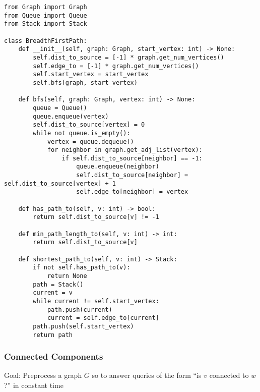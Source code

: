 \documentclass[a4paper]{article}
\begin{document}
\begin{lstlisting}
from Graph import Graph
from Queue import Queue
from Stack import Stack

class BreadthFirstPath:
    def __init__(self, graph: Graph, start_vertex: int) -> None:
        self.dist_to_source = [-1] * graph.get_num_vertices()
        self.edge_to = [-1] * graph.get_num_vertices()
        self.start_vertex = start_vertex
        self.bfs(graph, start_vertex)

    def bfs(self, graph: Graph, vertex: int) -> None:
        queue = Queue()
        queue.enqueue(vertex)
        self.dist_to_source[vertex] = 0
        while not queue.is_empty():
            vertex = queue.dequeue()
            for neighbor in graph.get_adj_list(vertex):
                if self.dist_to_source[neighbor] == -1:
                    queue.enqueue(neighbor)
                    self.dist_to_source[neighbor] = self.dist_to_source[vertex] + 1
                    self.edge_to[neighbor] = vertex

    def has_path_to(self, v: int) -> bool:
        return self.dist_to_source[v] != -1

    def min_path_length_to(self, v: int) -> int:
        return self.dist_to_source[v]

    def shortest_path_to(self, v: int) -> Stack:
        if not self.has_path_to(v):
            return None
        path = Stack()
        current = v
        while current != self.start_vertex:
            path.push(current)
            current = self.edge_to[current]
        path.push(self.start_vertex)
        return path
\end{lstlisting}

\subsubsection*{Connected Components}
Goal: Preprocess a graph $G$ so to answer queries of the form “is $v$ connected to $w$?” in constant time
\end{document}
